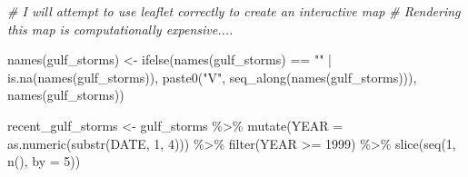 \documentclass[12pt,letterpaper]{article}
\newenvironment{Shaded}{\begin{snugshade}}{\end{snugshade}}
\newenvironment{Highlighting}{}{}
\newcommand{\DecValTok}[1]{\textcolor[rgb]{0.00,0.00,0.81}{#1}}
\newcommand{\StringTok}[1]{\textcolor[rgb]{0.31,0.60,0.02}{#1}}
\newcommand{\CommentTok}[1]{\textcolor[rgb]{0.56,0.35,0.01}{\textit{#1}}}
\newcommand{\OtherTok}[1]{\textcolor[rgb]{0.56,0.35,0.01}{#1}}
\newcommand{\FunctionTok}[1]{\textcolor[rgb]{0.00,0.00,0.00}{#1}}
\newcommand{\NormalTok}[1]{#1}
\newcommand{\SpecialCharTok}[1]{\textcolor[rgb]{0.00,0.00,0.00}{#1}}
\newcommand{\AttributeTok}[1]{\textcolor[rgb]{0.77,0.63,0.00}{#1}}
\begin{document}
\begin{Shaded}
\begin{Highlighting}[]
\CommentTok{\# I will attempt to use leaflet correctly to create an interactive map}
\CommentTok{\# Rendering this map is computationally expensive....}

\FunctionTok{names}\NormalTok{(gulf\_storms) }\OtherTok{\textless{}{-}} \FunctionTok{ifelse}\NormalTok{(}\FunctionTok{names}\NormalTok{(gulf\_storms) }\SpecialCharTok{==} \StringTok{""} \SpecialCharTok{|} \FunctionTok{is.na}\NormalTok{(}\FunctionTok{names}\NormalTok{(gulf\_storms)), }\FunctionTok{paste0}\NormalTok{(}\StringTok{"V"}\NormalTok{, }\FunctionTok{seq\_along}\NormalTok{(}\FunctionTok{names}\NormalTok{(gulf\_storms))), }\FunctionTok{names}\NormalTok{(gulf\_storms))}

\NormalTok{recent\_gulf\_storms }\OtherTok{\textless{}{-}}\NormalTok{ gulf\_storms }\SpecialCharTok{\%\textgreater{}\%}
  \FunctionTok{mutate}\NormalTok{(}\AttributeTok{YEAR =} \FunctionTok{as.numeric}\NormalTok{(}\FunctionTok{substr}\NormalTok{(DATE, }\DecValTok{1}\NormalTok{, }\DecValTok{4}\NormalTok{))) }\SpecialCharTok{\%\textgreater{}\%}
  \FunctionTok{filter}\NormalTok{(YEAR }\SpecialCharTok{\textgreater{}=} \DecValTok{1999}\NormalTok{) }\SpecialCharTok{\%\textgreater{}\%}
  \FunctionTok{slice}\NormalTok{(}\FunctionTok{seq}\NormalTok{(}\DecValTok{1}\NormalTok{, }\FunctionTok{n}\NormalTok{(), }\AttributeTok{by =} \DecValTok{5}\NormalTok{))}


\end{Highlighting}
\end{Shaded}
\end{document}
